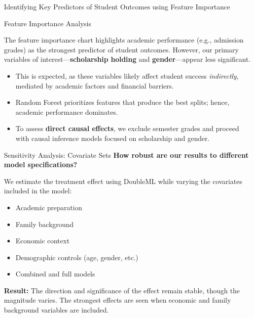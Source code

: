 \documentclass[aspectratio=169]{beamer}
\begin{document}
\begin{frame}{Identifying Key Predictors of Student Outcomes using Feature Importance}
\begin{block}{Feature Importance Analysis}
   
    The feature importance chart highlights academic performance (e.g., admission grades) as the strongest predictor of student outcomes. However, our primary variables of interest—\textbf{scholarship holding} and \textbf{gender}—appear less significant.
\end{block}


\begin{itemize}[label=--]
    \item This is expected, as these variables likely affect student success \textit{indirectly}, mediated by academic factors and financial barriers.
    \item Random Forest prioritizes features that produce the best splits; hence, academic performance dominates.
    \item To assess \textbf{direct causal effects}, we exclude semester grades and proceed with causal inference models focused on scholarship and gender.
\end{itemize}
\end{frame}

\begin{frame}{Sensitivity Analysis: Covariate Sets}
\textbf{How robust are our results to different model specifications?}
\vspace{5pt}

We estimate the treatment effect using DoubleML while varying the covariates included in the model:

\begin{itemize}[label=--,itemsep=1pt]
    \item Academic preparation
    \item Family background
    \item Economic context
    \item Demographic controls (age, gender, etc.)
    \item Combined and full models
\end{itemize}

\vspace{5pt}
\textbf{Result:} The direction and significance of the effect remain stable, though the magnitude varies. The strongest effects are seen when economic and family background variables are included.
\end{frame}
\end{document}
